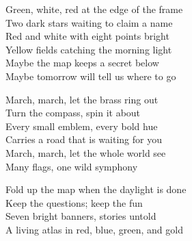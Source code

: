 \begin{lyrics}
Green, white, red at the edge of the frame\\
Two dark stars waiting to claim a name\\
Red and white with eight points bright\\
Yellow fields catching the morning light\\
Maybe the map keeps a secret below\\
Maybe tomorrow will tell us where to go


March, march, let the brass ring out\\
Turn the compass, spin it about\\
Every small emblem, every bold hue\\
Carries a road that is waiting for you\\
March, march, let the whole world see\\
Many flags, one wild symphony

Fold up the map when the daylight is done\\
Keep the questions; keep the fun\\
Seven bright banners, stories untold\\
A living atlas in red, blue, green, and gold
\end{lyrics}

